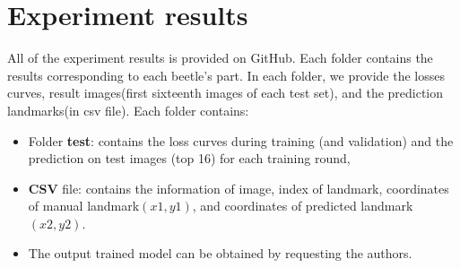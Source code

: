 \documentclass[12pt,a4paper]{article}
\begin{document}
\section{Experiment results}
\label{apb}
All of the experiment results is provided on GitHub. Each folder contains the results corresponding to each beetle's part. In each folder, we provide the losses curves, result images(first sixteenth images of each test set), and the prediction landmarks(in csv file). Each folder contains:
\begin{itemize}
	\item Folder \textbf{test}: contains the loss curves during training (and validation) and the prediction on test images (top 16) for each training round,
	\item \textbf{CSV} file: contains the information of image, index of landmark, coordinates of manual landmark$(x1,y1)$, and coordinates of predicted landmark$(x2,y2)$.
	\item The output trained model can be obtained by requesting the authors.
\end{itemize}
\end{document}
